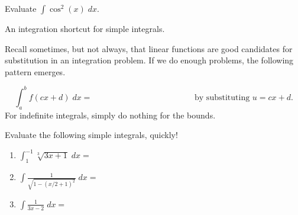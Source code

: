 \documentclass[../main.tex]{subfiles}
\begin{document}
\begin{example}
  Evaluate \(\int \cos^{2}(x) \;dx\).

\end{example}

\clearpage
An integration shortcut for simple integrals.

Recall sometimes, but not always, that linear functions are good candidates for substitution in an integration problem. If we do enough problems, the following pattern emerges.
\begin{mdframed}[style=simple]
  \begin{equation} \label{eq:integration-affine-substitution}
    \int_{a}^{b} f(cx+ d) \;dx = \hspace{2in} \text{ by substituting } u = cx + d.
  \end{equation}
  For indefinite integrals, simply do nothing for the bounds. 
\end{mdframed}

\begin{example}
  Evaluate the following simple integrals, quickly!

  \begin{enumerate}[wide]
    \item \(\int_{1}^{-1} \sqrt[3]{3x + 1} \;dx = \)


    \item \(\int \frac{1}{\sqrt{1 - (x/2 + 1)^2}} \;dx = \)


    \item \(\int \frac{1}{3x-2} \;dx = \)

  \end{enumerate}
\end{example}
\end{document}
